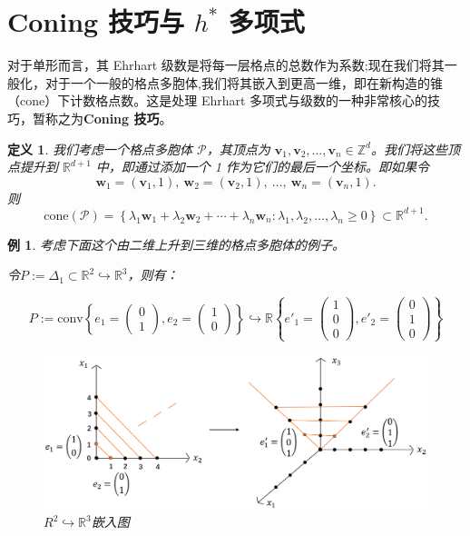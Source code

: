 \documentclass[12pt,a4paper]{ctexbook} %
\newcounter{theorem}[section]
\newtheorem{definition}[theorem]{定义}
\newtheorem{example}[theorem]{例}
\numberwithin{figure}{section}
\theoremstyle{problemstyle}
\numberwithin{equation}{section} %
\begin{document}
\section{Coning 技巧与 $h^*$ 多项式}

对于单形而言，其 Ehrhart 级数是将每一层格点的总数作为系数;现在我们将其一般化，对于一个一般的格点多胞体,我们将其嵌入到更高一维，即在新构造的锥（cone）下计数格点数。这是处理 Ehrhart 多项式与级数的一种非常核心的技巧，暂称之为\textbf{Coning 技巧}。

\begin{definition}
    我们考虑一个格点多胞体 $\mathcal{P}$，其顶点为 $\mathbf{v}_1, \mathbf{v}_2, \ldots, \mathbf{v}_n \in \mathbb{Z}^d$。我们将这些顶点提升到 $\mathbb{R}^{d+1}$ 中，即通过添加一个 1 作为它们的最后一个坐标。即如果令
$$
\mathbf{w}_1 = (\mathbf{v}_1, 1), \ \mathbf{w}_2 = (\mathbf{v}_2, 1), \ \ldots, \ \mathbf{w}_n = (\mathbf{v}_n, 1).
$$
则
$$
\text{cone}(\mathcal{P}) = \left\{\lambda_1 \mathbf{w}_1 + \lambda_2 \mathbf{w}_2 + \cdots + \lambda_n \mathbf{w}_n : \lambda_1, \lambda_2, \ldots, \lambda_n \geq 0\right\} \subset \mathbb{R}^{d+1}.
$$
\end{definition}\label{coning1}
\begin{example}
    考虑下面这个由二维上升到三维的格点多胞体的例子。

令$
P := \Delta_1 \subset \mathbb{R}^2
\hookrightarrow \mathbb{R}^3
$，则有：

$$
P := \text{conv}\left\{ e_1 = \begin{pmatrix} 0 \\ 1 \end{pmatrix}, e_2 = \begin{pmatrix} 1 \\ 0 \end{pmatrix} \right\} \hookrightarrow \mathbb{R}\left\{ e'_1 = \begin{pmatrix} 1 \\ 0 \\ 0 \end{pmatrix}, e'_2 = \begin{pmatrix} 0 \\ 1 \\ 0 \end{pmatrix} \right\}
$$


\begin{figure}[H] %
    \centering
    \includegraphics[width=1.0\textwidth]{image5.png} %
    \caption{${R}^2 \hookrightarrow \mathbb {R}^3$嵌入图} %
    \label{fig:my_image} %
\end{figure}
\end{example} 
\end{document}
